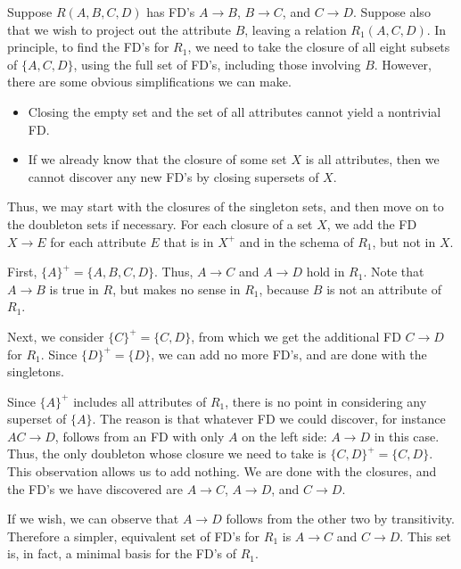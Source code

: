     \begin{example}
      Suppose $R(A,B,C,D)$ has FD's $A \rightarrow B$, $B \rightarrow C$, and $C \rightarrow D$. Suppose also that we wish to project out the attribute $B$, leaving a relation $R_1(A,C,D)$. In principle, to find the FD's for $R_1$, we need to take the closure of all eight subsets of $\{A, C, D\}$, using the full set of FD's, including those involving $B$. However, there are some obvious simplifications we can make.

      \begin{itemize}
        \item Closing the empty set and the set of all attributes cannot yield a nontrivial FD.
        \item If we already know that the closure of some set $X$ is all attributes, then we cannot discover any new FD's by closing supersets of $X$.
      \end{itemize}

      Thus, we may start with the closures of the singleton sets, and then move on to the doubleton sets if necessary. For each closure of a set $X$, we add the FD $X \rightarrow E$ for each attribute $E$ that is in $X^+$ and in the schema of $R_1$, but not in $X$.

      First, $\{A\}^+ = \{A,B,C,D\}$. Thus, $A \rightarrow C$ and $A \rightarrow D$ hold in $R_1$. Note that $A \rightarrow B$ is true in $R$, but makes no sense in $R_1$, because $B$ is not an attribute of $R_1$.

      Next, we consider $\{C\}^+ = \{C,D\}$, from which we get the additional FD $C \rightarrow D$ for $R_1$. Since $\{D\}^+ = \{D\}$, we can add no more FD's, and are done with the singletons.

      Since $\{A\}^+$ includes all attributes of $R_1$, there is no point in considering any superset of $\{A\}$. The reason is that whatever FD we could discover, for instance $AC \rightarrow D$, follows from an FD with only $A$ on the left side: $A \rightarrow D$ in this case. Thus, the only doubleton whose closure we need to take is $\{C, D\}^+ = \{C,D\}$. This observation allows us to add nothing. We are done with the closures, and the FD's we have discovered are $A \rightarrow C$, $A \rightarrow D$, and $C \rightarrow D$.

      If we wish, we can observe that $A \rightarrow D$ follows from the other two by transitivity. Therefore a simpler, equivalent set of FD's for $R_1$ is $A \rightarrow C$ and $C \rightarrow D$. This set is, in fact, a minimal basis for the FD's of $R_1$. 
    \end{example}

